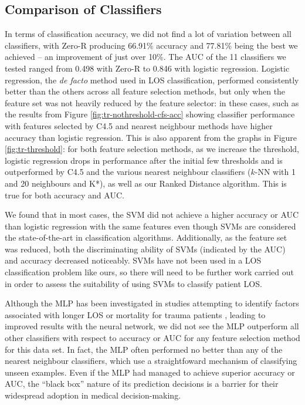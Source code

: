 \documentclass{article}
\begin{document}
\subsection{Comparison of Classifiers}
In terms of classification accuracy, we did not find a lot of variation
between all classifiers, with Zero-R producing 66.91\% accuracy and 77.81\%
being the best we achieved -- an improvement of just over 10\%. The AUC of
the 11 classifiers we tested ranged from 0.498 with Zero-R to 0.846 with
logistic regression. Logistic regression, the \textit{de facto} method
used in LOS classification, performed consistently better than the others
across all feature
selection methods, but only when the feature set was not heavily reduced by
the feature selector: in these cases, such as the results from Figure
\ref{fig:tr-nothreshold-cfs-acc} showing classifier performance with features
selected by C4.5 and nearest
neighbour methods have higher accuracy than logistic regression. This is also
apparent from the graphs in Figure \ref{fig:tr-threshold}: for both
feature selection methods, as we increase the threshold, logistic regression
drops in performance after the initial few thresholds and is outperformed by
C4.5 and the various nearest neighbour classifiers ($k$-NN with 1 and 20
neighbours and K*), as well as our Ranked Distance algorithm.
This is true for both accuracy and AUC.

We found that in most cases, the SVM did not achieve a higher accuracy or
AUC than logistic regression with the same features even though SVMs are
considered the state-of-the-art in classification algorithms. Additionally,
as the feature set was reduced, both the discriminating ability of SVMs
(indicated by the AUC) and accuracy decreased noticeably. SVMs have not been
used in a LOS classification problem like
ours, so there will need to be further work carried out in order to assess the
suitability of using SVMs to classify patient LOS.

Although the MLP has been investigated in studies attempting to identify
factors associated with longer LOS or mortality for trauma patients
\cite{Hunter2000,McGonigal1993}, leading to improved results with the neural
network, we did not see the MLP outperform all other classifiers with respect
to accuracy or AUC for any feature selection method for this data set. In fact,
the MLP often performed no better than any of the nearest neighbour
classifiers, which use a straightfoward mechanism of classifying unseen
examples. Even if the MLP had managed to achieve superior accuracy or AUC, the
``black box'' nature of its prediction decisions is a barrier for their
widespread adoption in medical decision-making.
\end{document}

